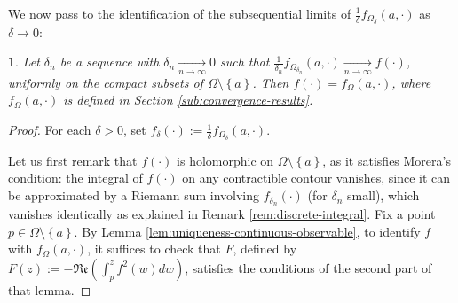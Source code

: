 \documentclass[oneside,english]{amsart}
\numberwithin{equation}{section}
\numberwithin{figure}{section}
\theoremstyle{plain}
\theoremstyle{plain}
\theoremstyle{plain}
\theoremstyle{plain}
\newtheorem{prop}[thm]{\protect\propositionname}
\theoremstyle{plain}
\theoremstyle{definition}
\theoremstyle{remark}
\providecommand{\propositionname}{Proposition}
\begin{document}
We now pass to the identification of the subsequential limits of $\frac{1}{\delta}f_{\Omega_{\delta}}\left(a,\cdot\right)$
as $\delta\to0$:
\begin{prop}
\label{pro:identification-subsequential-limits}Let $\delta_{n}$
be a sequence with $\delta_{n}\underset{n\to\infty}{\longrightarrow}0$
such that $\frac{1}{\delta_{n}}f_{\Omega_{\delta_{n}}}\left(a,\cdot\right)\underset{n\to\infty}{\longrightarrow}f\left(\cdot\right)$,
uniformly on the compact subsets of $\Omega\setminus\left\{ a\right\} $.
Then $f\left(\cdot\right)=f_{\Omega}\left(a,\cdot\right)$, where
$f_{\Omega}\left(a,\cdot\right)$ is defined in Section \ref{sub:convergence-results}.\end{prop}
\begin{proof}
For each $\delta>0$, set $f_{\delta}\left(\cdot\right):=\frac{1}{\delta}f_{\Omega_{\delta}}\left(a,\cdot\right)$. 

Let us first remark that $f\left(\cdot\right)$ is holomorphic on
$\Omega\setminus\left\{ a\right\} $, as it satisfies Morera's condition:
the integral of $f\left(\cdot\right)$ on any contractible contour
vanishes, since it can be approximated by a Riemann sum involving
$f_{\delta_{n}}\left(\cdot\right)$ (for $\delta_{n}$ small), which
vanishes identically as explained in Remark \ref{rem:discrete-integral}.
Fix a point $p\in\Omega\setminus\left\{ a\right\} $. By Lemma \ref{lem:uniqueness-continuous-observable},
to identify $f$ with $f_{\Omega}\left(a,\cdot\right)$, it suffices
to check that $F$, defined by $F\left(z\right):=-\Re\mathfrak{e}\left(\int_{p}^{z}f^{2}\left(w\right)dw\right)$,
satisfies the conditions of the second part of that lemma. 


\end{proof}
\end{document}

